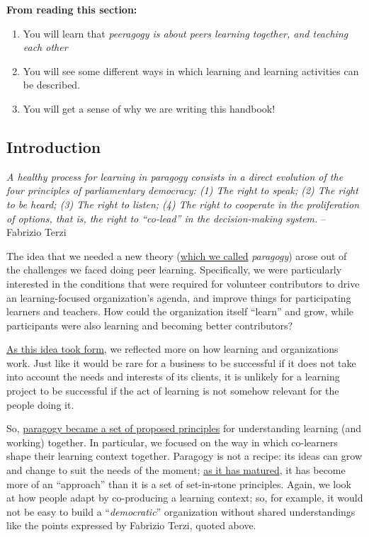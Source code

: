 \textbf{From reading this section:}

\begin{enumerate}
\item
  You will learn that \emph{peeragogy is about peers learning together,
  and teaching each other}
\item
  You will see some different ways in which learning and learning
  activities can be described.
\item
  You will get a sense of why we are writing this handbook!
\end{enumerate}
\subsection{Introduction}

\emph{A healthy process for learning in paragogy consists in a direct
evolution of the four principles of parliamentary democracy: (1) The
right to speak; (2) The right to be heard; (3) The right to listen; (4)
The right to cooperate in the proliferation of options, that is, the
right to ``co-lead'' in the decision-making system.} -- Fabrizio
Terzi\href{http://campus.ftacademy.org/community/mod/groups/topicposts.php?topic=10060\&group\_guid=8500}{}

The idea that we needed a new theory
(\href{http://archive.p2pu.org/general/node/5574/forums/9415\#comment-4054}{which
we called} \emph{paragogy}) arose out of the challenges we faced doing
peer learning. Specifically, we were particularly interested in the
conditions that were required for volunteer contributors to drive an
learning-focused organization's agenda, and improve things for
participating learners and teachers. How could the organization itself
``learn'' and grow, while participants were also learning and becoming
better contributors?

\href{http://archive.p2pu.org/general/node/15138/forums/25213}{As this
idea took form}, we reflected more on how learning and organizations
work. Just like it would be rare for a business to be successful if it
does not take into account the needs and interests of its clients, it is
unlikely for a learning project to be successful if the act of learning
is not somehow relevant for the people doing it.

So,
\href{http://en.wikiversity.org/wiki/File:Paragogy-final.pdf}{paragogy
became a set of proposed principles} for understanding learning (and
working) together. In particular, we focused on the way in which
co-learners shape their learning context together. Paragogy is not a
recipe: its ideas can grow and change to suit the needs of the moment;
\href{http://paragogy.net/ParagogyPaper2}{as it has matured}, it has
become more of an ``approach'' than it is a set of set-in-stone
principles. Again, we look at how people adapt by co-producing a
learning context; so, for example, it would not be easy to build a
``\emph{democratic}'' organization without shared understandings like the
points expressed by Fabrizio Terzi, quoted above.

